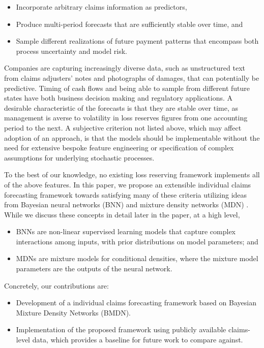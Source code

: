 \documentclass{article}
\begin{document}
\begin{itemize}
	\item Incorporate arbitrary claims information as predictors,
	\item Produce multi-period forecasts that are sufficiently stable over time, 
	and
	\item Sample different realizations of future payment patterns that encompass 
	both process uncertainty and model risk.
\end{itemize}
Companies are capturing increasingly diverse data, such as unstructured text 
from claims adjusters' notes and photographs of damages, that can potentially 
be predictive. Timing of cash flows and being able to sample from different 
future states have both business decision making and regulatory applications. A 
desirable characteristic of the forecasts is that they are stable over time, as 
management is averse to volatility in loss reserves figures from one accounting 
period to the next. A subjective criterion not listed above, which may affect
adoption of an approach, is that the models should be implementable without the
need for extensive bespoke feature engineering or specification of complex 
assumptions for underlying stochastic processes.

To the best of our knowledge, no existing loss reserving framework implements 
all of the above features. In this paper, we propose an extensible individual 
claims forecasting framework towards satisfying many of these criteria utilizing
ideas from Bayesian neural networks (BNN) \cite{nealBayesianLearning2012} and 
mixture density networks (MDN) \cite{bishopMixtureDensity1994}. While we discuss
these concepts in detail later in the paper, at a high level,

\begin{itemize}
  \item BNNs are non-linear supervised learning models that capture complex 
  interactions among inputs, with prior distributions on model parameters; and
  \item MDNs are mixture models for conditional densities, where the mixture
  model parameters are the outputs of the neural network.
\end{itemize}
Concretely, our contributions are:

\begin{itemize}
	\item Development of a individual claims forecasting framework based on 
	Bayesian Mixture Density Networks (BMDN).
	\item Implementation of the proposed framework using publicly available 
	claims-level data, which provides a baseline for future work to compare 
	against.
\end{itemize}
\end{document}
